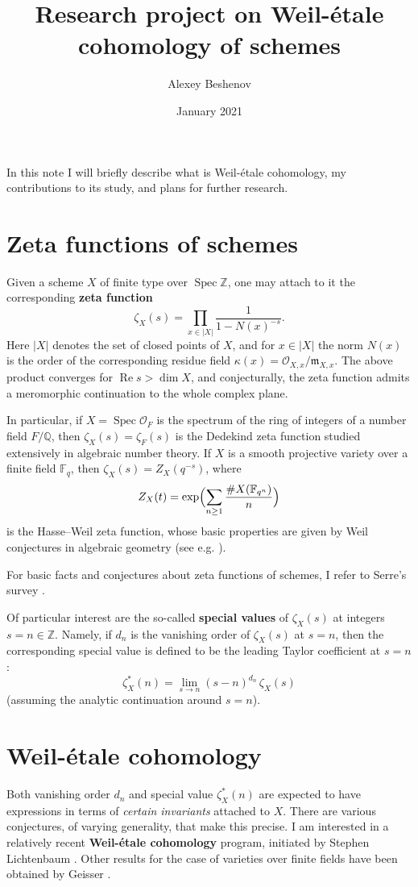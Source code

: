\documentclass{article}
\author{Alexey Beshenov}
\date{January 2021}
\title{Research project on Weil-étale cohomology of schemes}
\DeclareMathOperator{\Spec}{Spec}
\newcommand{\ZZ}{\mathbb{Z}}
\newcommand{\FF}{\mathbb{F}}
\newcommand{\QQ}{\mathbb{Q}}
\renewcommand{\Re}{\operatorname{Re}}
\begin{document}
\maketitle

In this note I will briefly describe what is Weil-étale cohomology,
my contributions to its study, and plans for further research.

\section{Zeta functions of schemes}

Given a scheme $X$ of finite type over $\Spec \ZZ$, one may attach to it the
corresponding \textbf{zeta function}
$$\zeta_X (s) = \prod_{x \in |X|} \frac{1}{1 - N (x)^{-s}}.$$
Here $|X|$ denotes the set of closed points of $X$, and for $x \in |X|$ the norm
$N (x)$ is the order of the corresponding residue field
$\kappa (x) = \mathcal{O}_{X,x}/\mathfrak{m}_{X,x}$. The above product converges
for $\Re s > \dim X$, and conjecturally, the zeta function admits a meromorphic
continuation to the whole complex plane.

In particular, if $X = \Spec \mathcal{O}_F$ is the spectrum of the ring of
integers of a number field $F/\QQ$, then $\zeta_X (s) = \zeta_F (s)$ is the
Dedekind zeta function studied extensively in algebraic number theory. If $X$ is
a smooth projective variety over a finite field $\FF_q$, then
$\zeta_X (s) = Z_X (q^{-s})$, where
$$Z_X (t) = \exp \Bigl(\sum_{n\ge 1} \frac{\# X (\FF_{q^n})}{n}\Bigr)$$
is the Hasse--Weil zeta function, whose basic properties are given by Weil
conjectures in algebraic geometry (see e.g. \cite{Katz-Motives}).

For basic facts and conjectures about zeta functions of schemes, I refer to
Serre's survey \cite{Serre-65}.

Of particular interest are the so-called \textbf{special values} of
$\zeta_X (s)$ at integers $s = n \in \ZZ$. Namely, if $d_n$ is the vanishing
order of $\zeta_X (s)$ at $s = n$, then the corresponding special value is
defined to be the leading Taylor coefficient at $s = n$:
$$\zeta_X^* (n) = \lim_{s \to n} (s - n)^{d_n}\,\zeta_X (s)$$
(assuming the analytic continuation around $s = n$).

\section{Weil-étale cohomology}

Both vanishing order $d_n$ and special value $\zeta_X^* (n)$ are expected to
have expressions in terms of \emph{certain invariants} attached to $X$. There
are various conjectures, of varying generality, that make this precise.  I am
interested in a relatively recent \textbf{Weil-étale cohomology} program,
initiated by Stephen Lichtenbaum
\cite{Lichtenbaum-05,Lichtenbaum-09-Euler,Lichtenbaum-09-number-rings}.  Other
results for the case of varieties over finite fields have been obtained by
Geisser \cite{Geisser-2004,Geisser-2006}.
\end{document}
